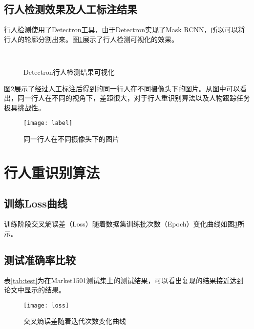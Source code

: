 \subsection{行人检测效果及人工标注结果}

行人检测使用了Detectron工具，由于Detectron实现了Mask RCNN，所以可以将行人的轮廓分割出来。图\ref{fig:detectron}展示了行人检测可视化的效果。

\begin{figure}
\centering
\subfloat[场景1]{\centering\texttt{[image: 1-2\_5\_151]}}\quad
\subfloat[场景2]{\centering\texttt{[image: 3-7\_10\_394]}}\\
\quad
{}
\caption{Detectron行人检测结果可视化}
\label{fig:detectron}
\end{figure}

图\ref{fig:label}展示了经过人工标注后得到的同一行人在不同摄像头下的图片。从图中可以看出，同一行人在不同的视角下，差距很大，对于行人重识别算法以及人物跟踪任务极具挑战性。

\begin{figure}
\centering
\texttt{[image: label]}
\caption{同一行人在不同摄像头下的图片}
\label{fig:label}
\end{figure}

\section{行人重识别算法}

\subsection{训练Loss曲线}

训练阶段交叉熵误差（Loss）随着数据集训练批次数（Epoch）变化曲线如图\ref{fig:loss}所示。

\subsection{测试准确率比较}

表\ref{tab:test}为在Market1501测试集上的测试结果，可以看出复现的结果接近达到论文中显示的结果。

\begin{figure}[]
\centering
\texttt{[image: loss]}
\caption{交叉熵误差随着迭代次数变化曲线}
\label{fig:loss}
\end{figure}

